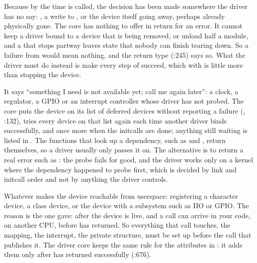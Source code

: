  Because by the time  is called, the decision has been made somewhere the
driver has no say: , a write to , or the device itself going away, perhaps
already physically gone. The core has nothing to offer in return for an error. It cannot keep a
driver bound to a device that is being removed, or unload half a module, and a  that
stops partway leaves state that nobody can finish tearing down. So a failure from 
would mean nothing, and the  return type (:245)
says so. What the driver must do instead is make every step of  succeed, which with
 is little more than stopping the device.

 It says ``something I need is not available yet; call me again later'': a clock, a
regulator, a GPIO or an interrupt controller whose driver has not probed. The core puts the device
on its list of deferred devices without reporting a failure (,
:132), tries every device on that list again each time another driver binds
successfully, and once more when the initcalls are done; anything still waiting is listed in
. The functions that look up a dependency, such as
 and , return  themselves, so a driver
usually only passes it on. The alternative is to return a real error such as : the
probe fails for good, and the driver works only on a kernel where the dependency happened to probe
first, which is decided by link and initcall order and not by anything the driver controls.

 Whatever makes the device reachable from userspace: registering a character device, a
class device, or the device with a subsystem such as IIO or GPIO. The reason is the one
 gave: after  the device is live, and a call can arrive in your
code, on another CPU, before  has returned. So everything that call touches, the
mapping, the interrupt, the private structure, must be set up before the call that publishes it.
The driver core keeps the same rule for the attributes in : it adds them only
after  has returned successfully (:676).


